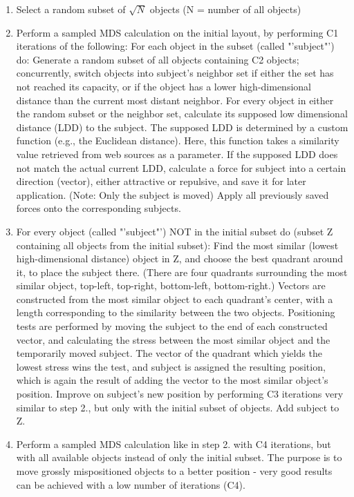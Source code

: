 \begin{enumerate}
	\item Select a random subset of $\sqrt{N}$ objects (N = number of all objects)
	\item Perform a sampled MDS calculation on the initial layout, by performing C1 iterations of the following:
		\subitem For each object in the subset (called "'subject"') do:
			\subsubitem Generate a random subset of all objects containing C2 objects; concurrently, switch objects into subject's neighbor set if either the set has not reached its capacity, or if the object has a lower high-dimensional distance than the current most distant neighbor.
			\subsubitem For every object in either the random subset or the neighbor set, calculate its supposed low dimensional distance (LDD) to the subject. The supposed LDD is determined by a custom function (e.g., the Euclidean distance). Here, this function takes a similarity value retrieved from web sources as a parameter.
			\subsubitem If the supposed LDD does not match the actual current LDD, calculate a force for subject into a certain direction (vector), either attractive or repulsive, and save it for later application. (Note: Only the subject is moved)
		\subitem Apply all previously saved forces onto the corresponding subjects.
	\item For every object (called "'subject"') NOT in the initial subset do (subset Z containing all objects from the initial subset):
		\subitem Find the most similar (lowest high-dimensional distance) object in Z, and choose the best quadrant around it, to place the subject there. (There are four quadrants surrounding the most similar object, top-left, top-right, bottom-left, bottom-right.)
			\subsubitem Vectors are constructed from the most similar object to each quadrant's center, with a length corresponding to the similarity between the two objects.
			\subsubitem Positioning tests are performed by moving the subject to the end of each constructed vector, and calculating the stress between the most similar object and the temporarily moved subject. The vector of the quadrant which yields the lowest stress wins the test, and subject is assigned the resulting position, which is again the result of adding the vector to the most similar object's position.
		\subitem Improve on subject's new position by performing C3 iterations very similar to step 2., but only with the initial subset of objects.
		\subitem Add subject to Z.
	\item Perform a sampled MDS calculation like in step 2. with C4 iterations, but with all available objects instead of only the initial subset. The purpose is to move grossly mispositioned objects to a better position - very good results can be achieved with a low number of iterations (C4).
		
\end{enumerate}

